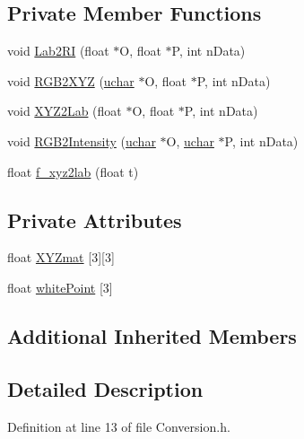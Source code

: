 \subsection*{Private Member Functions}
\begin{DoxyCompactItemize}
\item 
void \hyperlink{class_vision_1_1_conversion_adf3ad076d44a9986332f5078c5fa2cc7}{Lab2\+R\+I} (float $\ast$O, float $\ast$P, int n\+Data)
\item 
void \hyperlink{class_vision_1_1_conversion_afe7b24da82f77ff1116f8bc3d0a62fcc}{R\+G\+B2\+X\+Y\+Z} (\hyperlink{_soil_math_types_8h_a65f85814a8290f9797005d3b28e7e5fc}{uchar} $\ast$O, float $\ast$P, int n\+Data)
\item 
void \hyperlink{class_vision_1_1_conversion_a9ecc41c4226eafc55d0ee0cc550e593b}{X\+Y\+Z2\+Lab} (float $\ast$O, float $\ast$P, int n\+Data)
\item 
void \hyperlink{class_vision_1_1_conversion_a93626e56872b99ed79fd3540c6adf776}{R\+G\+B2\+Intensity} (\hyperlink{_soil_math_types_8h_a65f85814a8290f9797005d3b28e7e5fc}{uchar} $\ast$O, \hyperlink{_soil_math_types_8h_a65f85814a8290f9797005d3b28e7e5fc}{uchar} $\ast$P, int n\+Data)
\item 
float \hyperlink{class_vision_1_1_conversion_aea73f90915cd0459dcaf70fb3e109a82}{f\+\_\+xyz2lab} (float t)
\end{DoxyCompactItemize}
\subsection*{Private Attributes}
\begin{DoxyCompactItemize}
\item 
float \hyperlink{class_vision_1_1_conversion_ad0c6e6c63380927c63da7f967b5e61d1}{X\+Y\+Zmat} \mbox{[}3\mbox{]}\mbox{[}3\mbox{]}
\item 
float \hyperlink{class_vision_1_1_conversion_adbaed406827f7ffb583d003815a9f3f8}{white\+Point} \mbox{[}3\mbox{]}
\end{DoxyCompactItemize}
\subsection*{Additional Inherited Members}


\subsection{Detailed Description}


Definition at line 13 of file Conversion.\+h.



